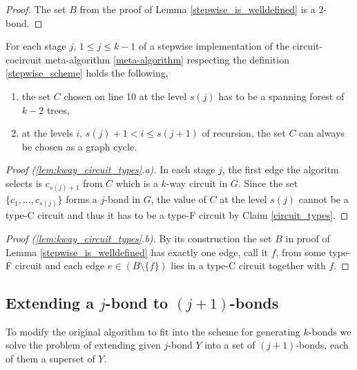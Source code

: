 \begin{proof}
	The set $B$ from the proof of Lemma \ref{stepwise_is_welldefined} is a $2$-bond.
\end{proof}


\begin{lem}
	\label{lem:kway_circuit_types}
	For each stage $j$, $1 \leq j \leq k-1$ of a stepwise implementation of the circuit-cocircuit meta-algorithm \ref{meta-algorithm} respecting the definition \ref{stepwise_scheme} holds the following,

	\begin{enumerate}[label=\alph*.]
		\item the set $C$ chosen on line 10 at the level $s(j)$ has to be a spanning forest of $k-2$ trees,
		\item at the levels $i$, $s(j)+1 < i \leq s(j+1)$ of recursion, the set $C$ can always be chosen as a graph cycle.
	\end{enumerate}
\end{lem}

\begin{proof}[Proof (\ref{lem:kway_circuit_types}.a)]
	In each stage $j$, the first edge the algoritm selects is $c_{s(j)+1}$ from $C$ which is a $k$-way circuit in $G$. Since the set $\{c_1,\ldots,c_{s(j)}\}$ forms a $j$-bond in $G$, the value of $C$ at the level $s(j)$ cannot be a type-C circuit and thus it has to be a type-F circuit by Claim \ref{circuit_types}.
\end{proof}

\begin{proof}[Proof (\ref{lem:kway_circuit_types}.b)]
	By its construction the set $B$ in proof of Lemma \ref{stepwise_is_welldefined} has exactly one edge, call it $f$, from some type-F circuit and each edge $e \in (B \setminus \{f\})$ lies in a type-C circuit together with $f$.
\end{proof}

\subsection*{Extending a $j$-bond to $(j+1)$-bonds}

To modify the original algorithm to fit into the scheme for generating $k$-bonds we solve the problem of extending given $j$-bond $Y$ into a set of $(j+1)$-bonds, each of them a superset of $Y$.

